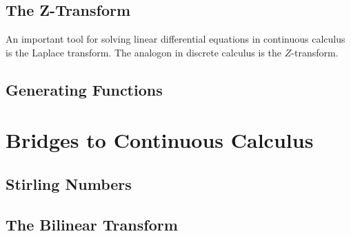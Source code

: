 


\subsection{The Z-Transform}
An important tool for solving linear differential equations in continuous calculus is the Laplace transform. The analogon in discrete calculus is the $Z$-transform. 






\subsection{Generating Functions}



\section{Bridges to Continuous Calculus}

\subsection{Stirling Numbers}




\subsection{The Bilinear Transform}

